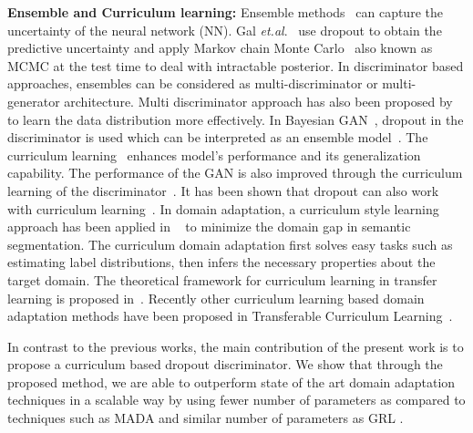 \documentclass{bmvc2k}
\begin{document}
\textbf{{Ensemble and Curriculum learning:}}
Ensemble methods~\cite{lakshminarayanan_nips2017} can capture the uncertainty of the neural network (NN). Gal \textit{et.al}.~\cite{gal_icml2016dropout} use dropout to obtain the predictive uncertainty and apply Markov chain Monte Carlo~\cite{neal_2012bayesian} also known as MCMC at the test time to deal with intractable posterior. In discriminator based approaches, ensembles can be considered as multi-discriminator or multi-generator architecture. Multi discriminator approach has also been proposed by~\cite{nguyen_nips2017dual,ghosh_corr2017multi,durugkar_2016generative} to learn the data distribution more effectively. In Bayesian GAN~\cite{saatci_nips2017bayesian}, dropout in the discriminator is used which can be interpreted as an ensemble model~\cite{gal_icml2016dropout}. The curriculum learning~\cite{bengio2009curriculum} enhances model's performance and its generalization capability. The performance of the GAN is also improved through the curriculum learning of the discriminator~\cite{sharma2018improved}. It has been shown that dropout can also work with curriculum learning~\cite{morerio2017curriculum}. In domain adaptation, a curriculum style learning approach has been applied in ~\cite{zhang2017curriculum} to minimize the domain gap in semantic segmentation. The curriculum domain adaptation first solves easy tasks such as estimating label distributions, then infers the necessary properties about the target domain. The theoretical framework for curriculum learning in transfer learning is proposed in~\cite{weinshall2018curriculum}. Recently other curriculum learning based domain adaptation methods have been proposed in Transferable Curriculum Learning~\cite{shu2019transferable}.  

In contrast to the previous works, the main contribution of the present work is to propose a curriculum based dropout discriminator. We show that through the proposed method, we are able to outperform state of the art domain adaptation techniques in a scalable way by using fewer number of parameters as compared to techniques such as MADA\cite{pei_arxiv2018} and similar number of parameters as GRL \cite{ganin_ICML2015}.
\end{document}
